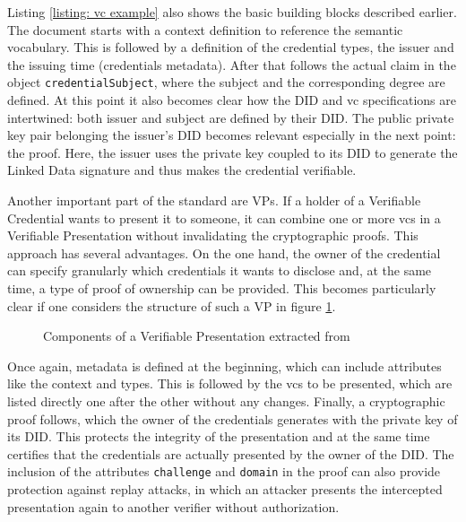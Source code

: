 	   Listing \ref{listing: vc example} also shows the basic building blocks described earlier. The document starts with a context definition to reference the semantic vocabulary. This is followed by a definition of the credential types, the issuer and the issuing time (credentials metadata). After that follows the actual claim in the object \texttt{credentialSubject}, where the subject and the corresponding degree are defined. At this point it also becomes clear how the \ac{DID} and \ac{vc} specifications are intertwined: both issuer and subject are defined by their DID.  The public private key pair belonging the issuer's DID becomes relevant especially in the next point: the proof. Here, the issuer uses the private key coupled to its DID to generate the Linked Data signature and thus makes the credential verifiable.
	   
	   Another important part of the standard are \acfp{VP}. If a holder of a Verifiable Credential wants to present it to someone, it can combine one or more \acp{vc} in a Verifiable Presentation without invalidating the cryptographic proofs. This approach has several advantages. On the one hand, the owner of the credential can specify granularly which credentials it wants to disclose and, at the same time, a type of proof of ownership can be provided. This becomes particularly clear if one considers the structure of such a \ac{VP} in figure \ref{figure: vp components}. \cite{sporny_verifiable_2019}
	   
	   \begin{figure}[ht]
    	    \centering
    	    \makebox[\textwidth]{}
            \caption{Components of a Verifiable Presentation extracted from \cite{sporny_verifiable_2019}}
            \label{figure: vp components}
        \end{figure}
        
        Once again, metadata is defined at the beginning, which can include attributes like the context and types. This is followed by the \acp{vc} to be presented, which are listed directly one after the other without any changes. Finally, a cryptographic proof follows, which the owner of the credentials generates with the private key of its \ac{DID}. This protects the integrity of the presentation and at the same time certifies that the credentials are actually presented by the owner of the \ac{DID}. The inclusion of the attributes \texttt{challenge} and \texttt{domain} in the proof can also provide protection against replay attacks, in which an attacker presents the intercepted presentation again to another verifier without authorization. \cite{sporny_verifiable_2019}
        
